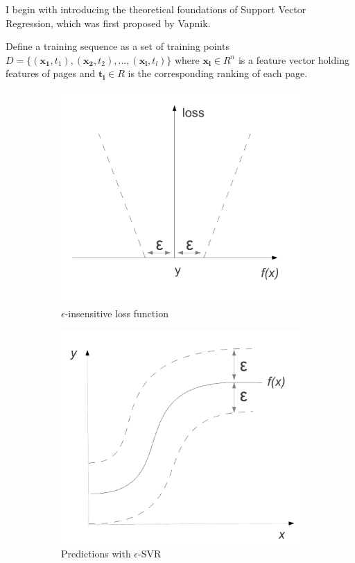 \documentclass[12pt,notitlepage,twoside]{scrbook}
\begin{document}
I begin with introducing the theoretical foundations of Support Vector
Regression, which was first proposed by Vapnik\cite{stat_learn}.

Define a training sequence as a set of training points \(D = \{ (\mathbf{x_1},t_1),
(\mathbf{x_2},t_2), ... , (\mathbf{x_l},t_l) \}\) where \( \mathbf{x_i} \in R^n \) is a
feature vector holding features of pages and \( \mathbf{t_i} \in R \) is the corresponding
ranking of each page.

\begin{figure}[h!]
  \centering 
  \begin{subfigure}[b]{0.49\textwidth}
  \includegraphics[width=\linewidth]{figs/loss.pdf}
  \caption{\(\epsilon\)-insensitive loss function}
  \label{eps1} 
\end{subfigure}
  \begin{subfigure}[b]{0.49\textwidth}
  \centering 
  \includegraphics[width=\linewidth]{figs/loss2.pdf}
  \caption{Predictions with \(\epsilon\)-SVR}
  \label{eps2} 
\end{subfigure}
\caption{\label{eps}}
\end{figure}
\end{document}
